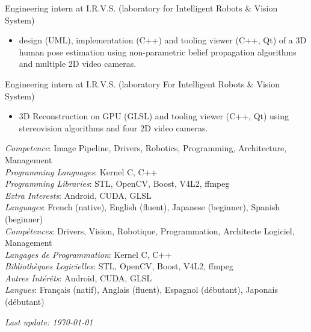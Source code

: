 \documentclass{article}
\begin{document}
\begin{llist}
 {
Engineering intern at I.R.V.S. (laboratory for Intelligent Robots \& Vision System)
\vspace{-0.33cm}
\begin{itemize}
\item design (UML), implementation (C++) and tooling viewer (C++, Qt) of a
3D human pose estimation using non-parametric belief propagation
algorithms and multiple 2D video cameras.
\end{itemize}
} {}

 {
Engineering intern at I.R.V.S. (laboratory For Intelligent Robots \& Vision System)
\vspace{-0.33cm}
\begin{itemize}
\item 3D Reconstruction on GPU (GLSL) and tooling viewer (C++, Qt) using stereovision algorithms and four 2D video cameras.
\end{itemize}
} {}

 {
{\em Competence}: Image Pipeline, Drivers, Robotics, Programming, Architecture, Management \\
{\em Programming Languages}: Kernel C, C++ \\
{\em Programming Libraries}: STL, OpenCV, Boost, V4L2, ffmpeg \\
{\em Extra Interests}: Android, CUDA, GLSL \\
{\em Languages}: French (native), English (fluent), Japanese (beginner), Spanish
(beginner) \\
} {
{\em Comp\'{e}tences}: Drivers, Vision, Robotique, Programmation, Architecte Logiciel,
Management \\
{\em Langages de Programmation}: Kernel C, C++ \\
{\em Biblioth\`{e}ques Logicielles}: STL, OpenCV, Boost, V4L2, ffmpeg \\
{\em Autres Int\'{e}r\^{e}ts}: Android, CUDA, GLSL \\
{\em Langues}: Fran\c{c}ais (natif), Anglais (fluent), Espagnol (d\'{e}butant),
Japonais (d\'{e}butant) \\
}


\end{llist}

{\em Last update: \today}
\end{document}
